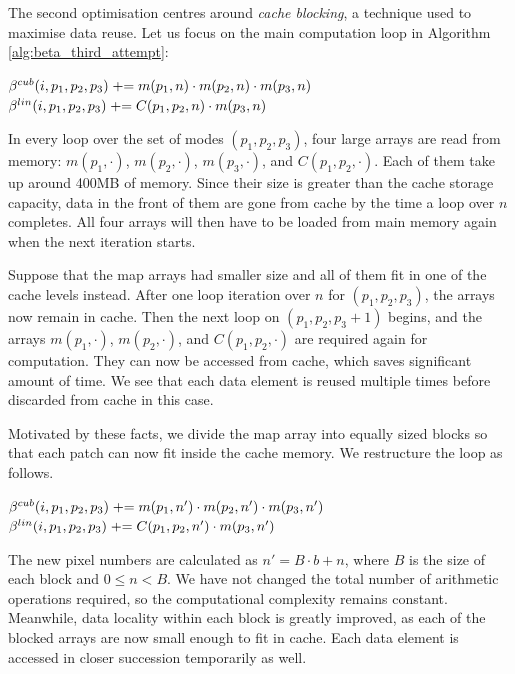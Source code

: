 The second optimisation centres around \textit{cache blocking}, a technique used to maximise data reuse. Let us focus on the main computation loop in Algorithm \ref{alg:beta_third_attempt}:

\begin{algorithmic}
			\State $\beta^{cub}(i, p_1, p_2, p_3) \mathrel{+}= m(p_1,n) \cdot m(p_2,n) \cdot m(p_3,n)$
			\State $\beta^{lin}(i, p_1, p_2, p_3) \mathrel{+}= C(p_1, p_2, n) \cdot m( p_3, n)$
		\EndFor
	\EndFor
\end{algorithmic}

In every loop over the set of modes $(p_1, p_2, p_3)$, four large arrays are read from memory: $m(p_1,\cdot)$, $m(p_2,\cdot)$, $m(p_3,\cdot)$, and $C(p_1, p_2, \cdot)$. Each of them take up around 400MB of memory. Since their size is greater than the cache storage capacity, data in the front of them are gone from cache by the time a loop over $n$ completes. All four arrays will then have to be loaded from main memory again when the next iteration starts.

Suppose that the map arrays had smaller size and all of them fit in one of the cache levels instead. After one loop iteration over $n$ for $(p_1, p_2, p_3)$, the arrays now remain in cache. Then the next loop on $(p_1, p_2, p_3+1)$ begins, and the arrays $m(p_1,\cdot)$, $m(p_2,\cdot)$, and $C(p_1,p_2,\cdot)$ are required again for computation. They can now be accessed from cache, which saves significant amount of time. We see that each data element is reused multiple times before discarded from cache in this case.

Motivated by these facts, we divide the map array into equally sized blocks so that each patch can now fit inside the cache memory. We restructure the loop as follows.

\begin{algorithmic}
				\State $\beta^{cub}(i, p_1, p_2, p_3) \mathrel{+}= m(p_1,n') \cdot m(p_2,n') \cdot m(p_3,n')$
				\State $\beta^{lin}(i, p_1, p_2, p_3) \mathrel{+}= C(p_1, p_2, n') \cdot m( p_3, n')$
			\EndFor
		\EndFor
	\EndFor
\end{algorithmic}

The new pixel numbers are calculated as $n' = B \cdot b + n$, where $B$ is the size of each block and $0 \le n < B$. We have not changed the total number of arithmetic operations required, so the computational complexity remains constant. Meanwhile, data locality within each block is greatly improved, as each of the blocked arrays are now small enough to fit in cache. Each data element is accessed in closer succession temporarily as well.

